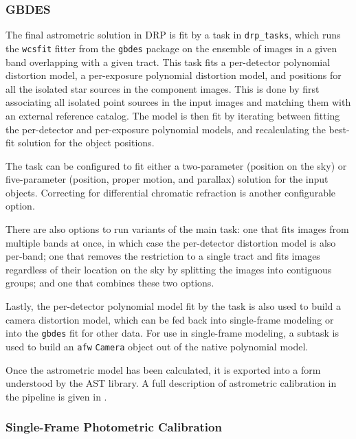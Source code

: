 \subsubsection{GBDES}
\label{sec:gbdes}

The final astrometric solution in DRP is fit by a task in \texttt{drp\_tasks}, which runs the \texttt{wcsfit} fitter from the \texttt{gbdes} package \citep{2022ascl.soft10011B,2017PASP..129g4503B} on the ensemble of images in a given band overlapping with a given tract.
This task fits a per-detector polynomial distortion model, a per-exposure polynomial distortion model, and positions for all the isolated star sources in the component images.
This is done by first associating all isolated point sources in the input images and matching them with an external reference catalog.
The model is then fit by iterating between fitting the per-detector and per-exposure polynomial models, and recalculating the best-fit solution for the object positions.

The task can be configured to fit either a two-parameter (position on the sky) or five-parameter (position, proper motion, and parallax) solution for the input objects.
Correcting for differential chromatic refraction is another configurable option.

There are also options to run variants of the main task: one that fits images from multiple bands at once, in which case the per-detector distortion model is also per-band; one that removes the restriction to a single tract and fits images regardless of their location on the sky by splitting the images into contiguous groups; and one that combines these two options.

Lastly, the per-detector polynomial model fit by the task is also used to build a camera distortion model, which can be fed back into single-frame modeling or into the \texttt{gbdes} fit for other data.
For use in single-frame modeling, a subtask is used to build an \texttt{afw} \texttt{Camera} object out of the native polynomial model.

Once the astrometric model has been calculated, it is exported into a form understood by the AST library.
A full description of astrometric calibration in the pipeline is given in \citet{DMTN-266}.

\subsubsection{Single-Frame Photometric Calibration}
\label{sec:photoCal}

